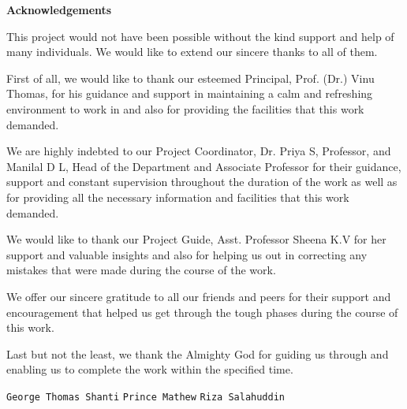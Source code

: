 \documentclass[11pt]{report}
\begin{document}
\begin{titlepage}
\vspace{.25in}	
\begin{center}
\textbf{Acknowledgements}\\
\end{center}
\normalsize

This project would not have been possible without the kind support and help of many individuals. We would like to extend our sincere thanks to all of them.
  
First of all, we would like to thank our esteemed Principal, Prof. (Dr.) Vinu Thomas, for his guidance and support in maintaining a calm and refreshing environment to work in and also for providing the facilities that this work demanded.
  
We are highly indebted to our Project Coordinator, Dr. Priya S, Professor, and Manilal D L, Head of the Department and Associate Professor for their guidance, support and constant supervision throughout the duration of the work as well as for providing all the necessary information and facilities that this work demanded.

We would like to thank our Project Guide, Asst. Professor Sheena K.V for her support and valuable insights and also for helping us out in correcting any mistakes that were made during the course of the work. 
  
We offer our sincere gratitude to all our friends and peers for their support and encouragement that helped us get through the tough phases during the course of this work.
  
Last but not the least, we thank the Almighty God for guiding us through and enabling us to complete the work within the specified time.
\vspace{.25in}

\vspace{.25in}


\flushleft \small{\texttt{George Thomas Shanti}}
\flushleft \small{\texttt{Prince Mathew}}
\flushleft \small{\texttt{Riza Salahuddin}}

\end{titlepage}
\end{document}

